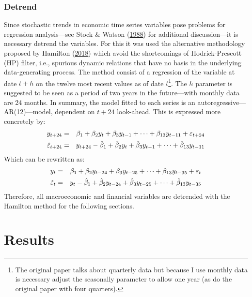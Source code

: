 \documentclass[12pt,twoside]{reedthesis}
\begin{document}
\hypertarget{detrend}{%
\subsection{Detrend}\label{detrend}}

Since stochastic trends in economic time series variables pose problems for regression analysis---see Stock \& Watson (\protect\hyperlink{ref-stocwats:1988}{1988}) for additional discussion---it is necessary detrend the variables. For this it was used the alternative methodology proposed by Hamilton (\protect\hyperlink{ref-hamilton:2018}{2018}) which avoid the shortcomings of Hodrick-Prescott (HP) filter, i.e., spurious dynamic relations that have no basis in the underlying data-generating process. The method consist of a regression of the variable at date \(t + h\) on the twelve most recent values as of date \(t\)\footnote{The original paper talks about quarterly data but because I use monthly data is necessary adjust the seasonally parameter to allow one year (as do the original paper with four quarters).}. The \(h\) parameter is suggested to be seen as a period of two years in the future---with monthly data are 24 months. In summary, the model fitted to each series is an autoregressive---AR(12)---model, dependent on \(t + 24\) look-ahead. This is expressed more concretely by:
\begin{eqnarray}
  y_{t+24} & = & \beta_{1} + \beta_{2}y_{t} + \beta_{3}y_{t - 1} + \cdots + \beta_{13}y_{t - 11} + \varepsilon_{t + 24}
  \\
  \hat{\varepsilon}_{t + 24} & = & y_{t + 24} - \hat{\beta}_{1} + \hat{\beta}_{2} y_{t} + \hat{\beta}_{3} y_{t - 1} + \cdots + \hat{\beta}_{13} y_{t - 11}
  \label{eq:hamilton-basic}
\end{eqnarray}
Which can be rewritten as:
\begin{eqnarray}
  y_{t} & = & \beta_{1} + \beta_{2} y_{t - 24} + \beta_{3} y_{t - 25} + \cdots + \beta_{13} y_{t - 35} + \varepsilon_{t}
  \\
  \hat{\varepsilon}_{t} & = & y_{t} - \hat{\beta}_{1} + \hat{\beta}_{2} y_{t - 24} + \hat{\beta}_{3} y_{t - 25} + \cdots + \hat{\beta}_{13} y_{t - 35}
  \label{eq:hamilton-final}
\end{eqnarray}
Therefore, all macroeconomic and financial variables are detrended with the Hamilton method for the following sections.

\hypertarget{results}{%
\chapter{Results}\label{results}}
\end{document}
